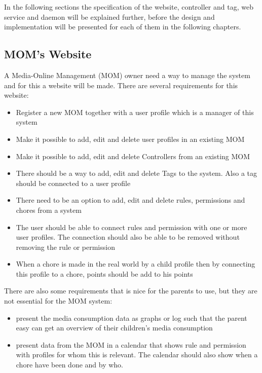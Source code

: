 In the following sections the specification of the website, controller and tag, web service and daemon will be explained further, before the design and implementation will be presented for each of them in the following chapters.  

\subsection{MOM's Website}
A Media-Online Management (MOM) owner need a way to manage the system and for this a website will be made. There are several requirements for this website:

\begin{itemize}
	\item Register a new MOM together with a user profile which is a manager of this system
	\item Make it possible to add, edit and delete user profiles in an existing MOM 
	\item Make it possible to add, edit and delete Controllers from an existing MOM
	\item There should be a way to add, edit and delete Tags to the system. Also a tag should be connected to a user profile
	\item There need to be an option to add, edit and delete rules, permissions and chores from a system
	\item The user should be able to connect rules and permission with one or more user profiles. The connection should also be able to be removed without removing the rule or permission
	\item When a chore is made in the real world by a child profile then by connecting this profile to a chore, points should be add to his points
\end{itemize}

There are also some requirements that is nice for the parents to use, but they are not essential for the MOM system:

\begin{itemize}
	\item present the media consumption data as graphs or log such that the parent easy can get an overview of their children's media consumption 
	\item present data from the MOM in a calendar that shows rule and permission with profiles for whom this is relevant. The calendar should also show when a chore have been done and by who.
\end{itemize}

